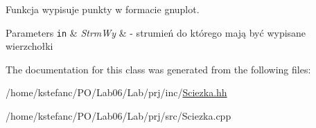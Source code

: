 Funkcja wypisuje punkty w formacie gnuplot. 


\begin{DoxyParams}[1]{Parameters}
\mbox{\tt in}  & {\em Strm\+Wy} & -\/ strumień do którego mają być wypisane wierzchołki \\
\hline
\end{DoxyParams}


The documentation for this class was generated from the following files\+:\begin{DoxyCompactItemize}
\item 
/home/kstefanc/\+P\+O/\+Lab06/\+Lab/prj/inc/\hyperlink{_sciezka_8hh}{Sciezka.\+hh}\item 
/home/kstefanc/\+P\+O/\+Lab06/\+Lab/prj/src/Sciezka.\+cpp\end{DoxyCompactItemize}
